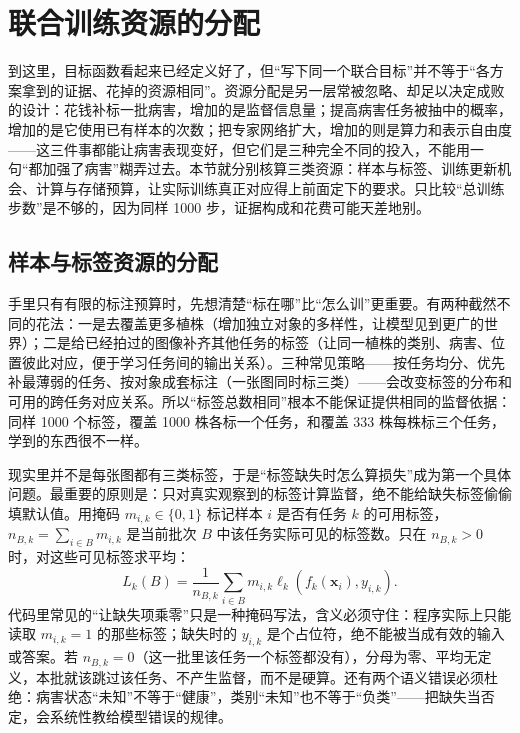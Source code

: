 \section{联合训练资源的分配}
\label{sec:ket-sharing-resources}

到这里，目标函数看起来已经定义好了，但“写下同一个联合目标”并不等于“各方案拿到的证据、花掉的资源相同”。资源分配是另一层常被忽略、却足以决定成败的设计：花钱补标一批病害，增加的是监督信息量；提高病害任务被抽中的概率，增加的是它使用已有样本的次数；把专家网络扩大，增加的则是算力和表示自由度——这三件事都能让病害表现变好，但它们是三种完全不同的投入，不能用一句“都加强了病害”糊弄过去。本节就分别核算三类资源：样本与标签、训练更新机会、计算与存储预算，让实际训练真正对应得上前面定下的要求。只比较“总训练步数”是不够的，因为同样 1000 步，证据构成和花费可能天差地别。

\subsection{样本与标签资源的分配}
\label{sec:ket-sharing-labels}

手里只有有限的标注预算时，先想清楚“标在哪”比“怎么训”更重要。有两种截然不同的花法：一是去覆盖更多植株（增加独立对象的多样性，让模型见到更广的世界）；二是给已经拍过的图像补齐其他任务的标签（让同一植株的类别、病害、位置彼此对应，便于学习任务间的输出关系）。三种常见策略——按任务均分、优先补最薄弱的任务、按对象成套标注（一张图同时标三类）——会改变标签的分布和可用的跨任务对应关系。所以“标签总数相同”根本不能保证提供相同的监督依据：同样 1000 个标签，覆盖 1000 株各标一个任务，和覆盖 333 株每株标三个任务，学到的东西很不一样。

现实里并不是每张图都有三类标签，于是“标签缺失时怎么算损失”成为第一个具体问题。最重要的原则是：只对真实观察到的标签计算监督，绝不能给缺失标签偷偷填默认值。用掩码 $m_{i,k}\in\{0,1\}$ 标记样本 $i$ 是否有任务 $k$ 的可用标签，$n_{B,k}=\sum_{i\in B}m_{i,k}$ 是当前批次 $B$ 中该任务实际可见的标签数。只在 $n_{B,k}>0$ 时，对这些可见标签求平均：
\begin{equation}
  L_k(B)=
  \frac{1}{n_{B,k}}
  \sum_{i\in B}m_{i,k}
  \ell_k(f_k(\bm x_i),y_{i,k}).
  \label{eq:ket-sharing-label-mask}
\end{equation}
代码里常见的“让缺失项乘零”只是一种掩码写法，含义必须守住：程序实际上只能读取 $m_{i,k}=1$ 的那些标签；缺失时的 $y_{i,k}$ 是个占位符，绝不能被当成有效的输入或答案。若 $n_{B,k}=0$（这一批里该任务一个标签都没有），分母为零、平均无定义，本批就该跳过该任务、不产生监督，而不是硬算。还有两个语义错误必须杜绝：病害状态“未知”不等于“健康”，类别“未知”也不等于“负类”——把缺失当否定，会系统性教给模型错误的规律。

